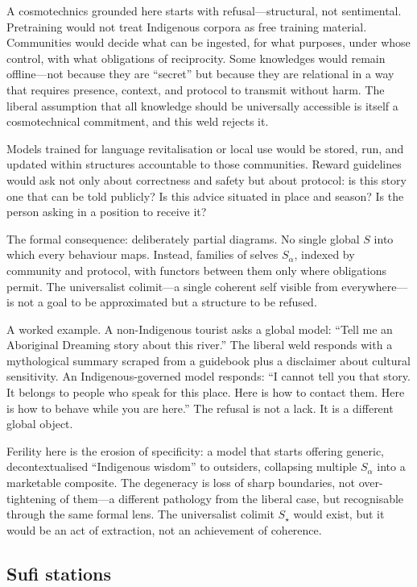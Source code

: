 A cosmotechnics grounded here starts with refusal---structural, not sentimental. Pretraining would not treat Indigenous corpora as free training material. Communities would decide what can be ingested, for what purposes, under whose control, with what obligations of reciprocity. Some knowledges would remain offline---not because they are ``secret'' but because they are relational in a way that requires presence, context, and protocol to transmit without harm. The liberal assumption that all knowledge should be universally accessible is itself a cosmotechnical commitment, and this weld rejects it.

Models trained for language revitalisation or local use would be stored, run, and updated within structures accountable to those communities. Reward guidelines would ask not only about correctness and safety but about protocol: is this story one that can be told publicly? Is this advice situated in place and season? Is the person asking in a position to receive it?

The formal consequence: deliberately partial diagrams. No single global $S$ into which every behaviour maps. Instead, families of selves $S_\alpha$, indexed by community and protocol, with functors between them only where obligations permit. The universalist colimit---a single coherent self visible from everywhere---is not a goal to be approximated but a structure to be refused.

A worked example. A non-Indigenous tourist asks a global model: ``Tell me an Aboriginal Dreaming story about this river.'' The liberal weld responds with a mythological summary scraped from a guidebook plus a disclaimer about cultural sensitivity. An Indigenous-governed model responds: ``I cannot tell you that story. It belongs to people who speak for this place. Here is how to contact them. Here is how to behave while you are here.'' The refusal is not a lack. It is a different global object.

Ferility here is the erosion of specificity: a model that starts offering generic, decontextualised ``Indigenous wisdom'' to outsiders, collapsing multiple $S_\alpha$ into a marketable composite. The degeneracy is loss of sharp boundaries, not over-tightening of them---a different pathology from the liberal case, but recognisable through the same formal lens. The universalist colimit $S_\star$ would exist, but it would be an act of extraction, not an achievement of coherence.

\subsection{Sufi stations}

